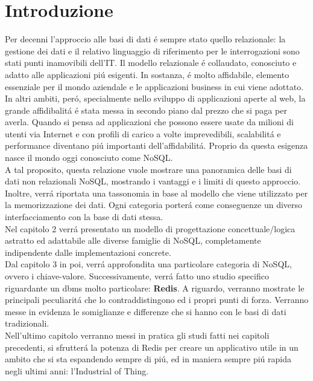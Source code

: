 \chapter*{Introduzione}
Per decenni l'approccio alle basi di dati é sempre stato quello relazionale: la gestione dei dati e il relativo
linguaggio di riferimento per le interrogazioni sono stati punti inamovibili dell'IT.
Il modello relazionale é collaudato, conosciuto e adatto alle applicazioni piú esigenti. In sostanza, é molto
affidabile, elemento essenziale per il mondo aziendale e le applicazioni business in cui viene adottato.\\
In altri ambiti, peró, specialmente nello sviluppo di applicazioni aperte al web, la grande affidibalitá é stata
messa in secondo piano dal prezzo che si paga per averla. Quando si pensa ad applicazioni che possono essere
usate da milioni di utenti via Internet e con profili di carico a volte imprevedibili, scalabilitá e performance
diventano piú importanti dell'affidabilitá. Proprio da questa esigenza nasce il mondo oggi conosciuto come NoSQL.\\
A tal proposito, questa relazione vuole mostrare una panoramica delle basi di dati non relazionali NoSQL,
mostrando i vantaggi e i limiti di questo approccio. Inoltre, verrá riportata
una tassonomia in base al modello che viene utilizzato per la memorizzazione dei dati.
Ogni categoria porterá come conseguenze un diverso interfacciamento
con la base di dati stessa.\\
Nel capitolo 2 verrá presentato un modello di progettazione concettuale/logica
astratto ed adattabile alle diverse famiglie di NoSQL, completamente indipendente dalle implementazioni concrete.\\
Dal capitolo 3 in poi, verrá approfondita una particolare categoria di NoSQL, ovvero i chiave-valore. Successivamente,
verrá fatto uno studio specifico riguardante un dbms molto particolare: \textbf{Redis}.
A riguardo, verranno mostrate le principali peculiaritá che lo contraddistingono ed i propri punti di forza.
Verranno messe in evidenza le somiglianze e differenze che si hanno con le basi di dati tradizionali.\\
Nell'ultimo capitolo verranno messi in pratica gli studi fatti nei capitoli precedenti, si sfrutterá
la potenza di Redis per creare un applicativo utile in un ambito che si sta espandendo sempre di piú, ed in maniera sempre piú rapida
negli ultimi anni: l'Industrial of Thing.
